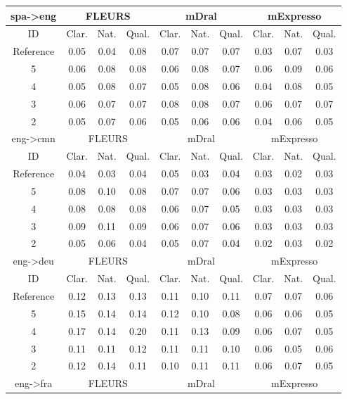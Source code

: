 \begin{table}[!ht]
\begin{tabular}{c|ccc|ccc|ccc}
\hline
spa->eng & \multicolumn{3}{c|}{FLEURS} & \multicolumn{3}{c|}{mDral} & \multicolumn{3}{c|}{mExpresso}\\
\hline
ID & Clar. & Nat. & Qual. & Clar. & Nat. & Qual. & Clar. & Nat. & Qual. \\
\hline
Reference & 0.05 & 0.04 & 0.08 & 0.07 & 0.07 & 0.07 & 0.03 & 0.07 & 0.03\\
5 & 0.06 & 0.08 & 0.08 & 0.06 & 0.08 & 0.07 & 0.06 & 0.09 & 0.06\\
4 & 0.05 & 0.08 & 0.07 & 0.05 & 0.08 & 0.06 & 0.04 & 0.08 & 0.05\\
3 & 0.06 & 0.07 & 0.07 & 0.08 & 0.08 & 0.07 & 0.06 & 0.07 & 0.07\\
2 & 0.05 & 0.07 & 0.06 & 0.05 & 0.06 & 0.06 & 0.04 & 0.06 & 0.05\\
\hline
eng->cmn & \multicolumn{3}{c|}{FLEURS} & \multicolumn{3}{c|}{mDral} & \multicolumn{3}{c|}{mExpresso}\\
\hline
ID & Clar. & Nat. & Qual. & Clar. & Nat. & Qual. & Clar. & Nat. & Qual. \\
\hline
Reference & 0.04 & 0.03 & 0.04 & 0.05 & 0.03 & 0.04 & 0.03 & 0.02 & 0.03\\
5 & 0.08 & 0.10 & 0.08 & 0.07 & 0.07 & 0.06 & 0.03 & 0.03 & 0.03\\
4 & 0.08 & 0.08 & 0.08 & 0.06 & 0.07 & 0.05 & 0.03 & 0.03 & 0.03\\
3 & 0.09 & 0.11 & 0.09 & 0.06 & 0.07 & 0.06 & 0.03 & 0.03 & 0.03\\
2 & 0.05 & 0.06 & 0.04 & 0.05 & 0.07 & 0.04 & 0.02 & 0.03 & 0.02\\
\hline
eng->deu & \multicolumn{3}{c|}{FLEURS} & \multicolumn{3}{c|}{mDral} & \multicolumn{3}{c|}{mExpresso}\\
\hline
ID & Clar. & Nat. & Qual. & Clar. & Nat. & Qual. & Clar. & Nat. & Qual. \\
\hline
Reference & 0.12 & 0.13 & 0.13 & 0.11 & 0.10 & 0.11 & 0.07 & 0.07 & 0.06\\
5 & 0.15 & 0.14 & 0.14 & 0.12 & 0.10 & 0.08 & 0.06 & 0.06 & 0.05\\
4 & 0.17 & 0.14 & 0.20 & 0.11 & 0.13 & 0.09 & 0.06 & 0.07 & 0.05\\
3 & 0.11 & 0.11 & 0.12 & 0.11 & 0.11 & 0.10 & 0.06 & 0.05 & 0.06\\
2 & 0.12 & 0.14 & 0.11 & 0.10 & 0.11 & 0.11 & 0.06 & 0.07 & 0.05\\
\hline
eng->fra & \multicolumn{3}{c|}{FLEURS} & \multicolumn{3}{c|}{mDral} & \multicolumn{3}{c|}{mExpresso}\\

\end{tabular}
\end{table}
